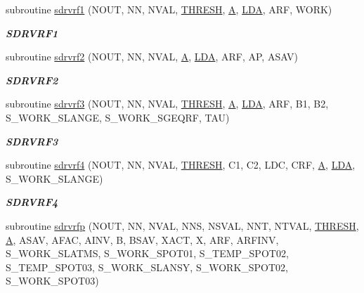 \begin{DoxyCompactItemize}
subroutine \hyperlink{group__single__lin_gacc03ae15cacbdcdb88dc3f2aec3870cc}{sdrvrf1} (N\+O\+U\+T, N\+N, N\+V\+A\+L, \hyperlink{zlaqgs_8c_a0656018abfc9fa2821827415f5d5ea57}{T\+H\+R\+E\+S\+H}, \hyperlink{classA}{A}, \hyperlink{example__user_8c_ae946da542ce0db94dced19b2ecefd1aa}{L\+D\+A}, A\+R\+F, W\+O\+R\+K)
\begin{DoxyCompactList}\small\item\em {\bfseries S\+D\+R\+V\+R\+F1} \end{DoxyCompactList}\item 
subroutine \hyperlink{group__single__lin_ga7840cfcf07cc4bd38bbbc88c7482fbc9}{sdrvrf2} (N\+O\+U\+T, N\+N, N\+V\+A\+L, \hyperlink{classA}{A}, \hyperlink{example__user_8c_ae946da542ce0db94dced19b2ecefd1aa}{L\+D\+A}, A\+R\+F, A\+P, A\+S\+A\+V)
\begin{DoxyCompactList}\small\item\em {\bfseries S\+D\+R\+V\+R\+F2} \end{DoxyCompactList}\item 
subroutine \hyperlink{group__single__lin_ga9a8604f18892afb24a856de008ea378f}{sdrvrf3} (N\+O\+U\+T, N\+N, N\+V\+A\+L, \hyperlink{zlaqgs_8c_a0656018abfc9fa2821827415f5d5ea57}{T\+H\+R\+E\+S\+H}, \hyperlink{classA}{A}, \hyperlink{example__user_8c_ae946da542ce0db94dced19b2ecefd1aa}{L\+D\+A}, A\+R\+F, B1, B2, S\+\_\+\+W\+O\+R\+K\+\_\+\+S\+L\+A\+N\+G\+E, S\+\_\+\+W\+O\+R\+K\+\_\+\+S\+G\+E\+Q\+R\+F, T\+A\+U)
\begin{DoxyCompactList}\small\item\em {\bfseries S\+D\+R\+V\+R\+F3} \end{DoxyCompactList}\item 
subroutine \hyperlink{group__single__lin_gaa7f1dac33429622a8b76027406f2e49d}{sdrvrf4} (N\+O\+U\+T, N\+N, N\+V\+A\+L, \hyperlink{zlaqgs_8c_a0656018abfc9fa2821827415f5d5ea57}{T\+H\+R\+E\+S\+H}, C1, C2, L\+D\+C, C\+R\+F, \hyperlink{classA}{A}, \hyperlink{example__user_8c_ae946da542ce0db94dced19b2ecefd1aa}{L\+D\+A}, S\+\_\+\+W\+O\+R\+K\+\_\+\+S\+L\+A\+N\+G\+E)
\begin{DoxyCompactList}\small\item\em {\bfseries S\+D\+R\+V\+R\+F4} \end{DoxyCompactList}\item 
subroutine \hyperlink{group__single__lin_ga56f8e2c079ad864fbc239f3f1d055174}{sdrvrfp} (N\+O\+U\+T, N\+N, N\+V\+A\+L, N\+N\+S, N\+S\+V\+A\+L, N\+N\+T, N\+T\+V\+A\+L, \hyperlink{zlaqgs_8c_a0656018abfc9fa2821827415f5d5ea57}{T\+H\+R\+E\+S\+H}, \hyperlink{classA}{A}, A\+S\+A\+V, A\+F\+A\+C, A\+I\+N\+V, B, B\+S\+A\+V, X\+A\+C\+T, X, A\+R\+F, A\+R\+F\+I\+N\+V, S\+\_\+\+W\+O\+R\+K\+\_\+\+S\+L\+A\+T\+M\+S, S\+\_\+\+W\+O\+R\+K\+\_\+\+S\+P\+O\+T01, S\+\_\+\+T\+E\+M\+P\+\_\+\+S\+P\+O\+T02, S\+\_\+\+T\+E\+M\+P\+\_\+\+S\+P\+O\+T03, S\+\_\+\+W\+O\+R\+K\+\_\+\+S\+L\+A\+N\+S\+Y, S\+\_\+\+W\+O\+R\+K\+\_\+\+S\+P\+O\+T02, S\+\_\+\+W\+O\+R\+K\+\_\+\+S\+P\+O\+T03)

\end{DoxyCompactItemize}
